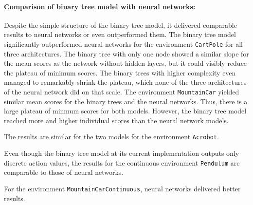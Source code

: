 \paragraph*{Comparison of binary tree model with neural networks:} Despite the simple structure of the binary tree model, it delivered comparable results to neural networks or even outperformed them. The binary tree model significantly outperformed neural networks for the environment \verb|CartPole| for all three architectures. The binary tree with only one node showed a similar slope for the mean scores as the network without hidden layers, but it could visibly reduce the plateau of minimum scores. The binary trees with higher complexity even managed to remarkably shrink the plateau, which none of the three architectures of the neural network did on that scale. The environment \verb|MountainCar| yielded similar mean scores for the binary trees and the neural networks. Thus, there is a large plateau of minmum scores for both models. However, the binary tree model reached more and higher individual scores than the neural network models.

The results are similar for the two models for the environment \verb|Acrobot|.

Even though the binary tree model at its current implementation outputs only discrete action values, the results for the continuous environment \verb|Pendulum| are comparable to those of neural networks.

For the environment \verb|MountainCarContinuous|, neural networks delivered better results.

